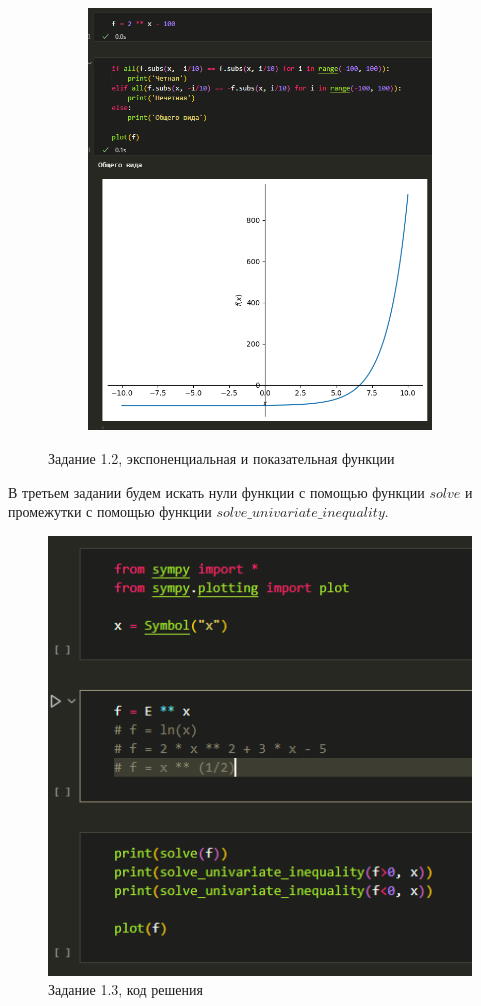 \documentclass[14pt,a4paper]{extarticle}
\begin{document}
\begin{figure}[h!]
\begin{subfigure}{.5\textwidth}
        \includegraphics[width=0.9\linewidth]{figures//inftech//lab1/1.2-a.png}
    \end{subfigure}
    \caption{Задание 1.2, экспоненциальная и показательная функции}
    \label{fig:1.2-exp}
\end{figure}

В третьем задании будем искать нули функции с помощью функции $solve$
и промежутки с помощью функции  $solve\_univariate\_inequality$.

\begin{figure}[h!]
    \centering
    \includegraphics[width=0.5\linewidth]{figures//inftech//lab1/1.3 code.png}
    \caption{Задание 1.3, код решения}
    \label{fig:enter-label}
\end{figure}
\end{document}
